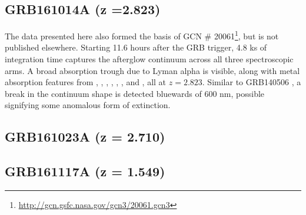 \documentclass{aa}    %
\begin{document}
\subsection{GRB161014A (z =2.823)}
The data presented here also formed the basis of GCN \#
20061\footnote{\url{http://gcn.gsfc.nasa.gov/gcn3/20061.gcn3}}, but is not
published elsewhere. Starting 11.6 hours after the GRB trigger, 4.8 ks of
integration time captures the afterglow continuum across all three
spectroscopic arms. A broad absorption trough due to Lyman alpha is visible,
along with metal absorption features from \mgii, \SIii, \cii, \civ, \alii,
\aliii, and	\feii, all at $z =2.823$. Similar to GRB140506 \citep{Fynbo2014}, a
break in the continuum shape is detected bluewards of 600 nm, possible
signifying some anomalous form of extinction.


\subsection{GRB161023A (z = 2.710)}	


\subsection{GRB161117A (z = 1.549)}	
\end{document}
